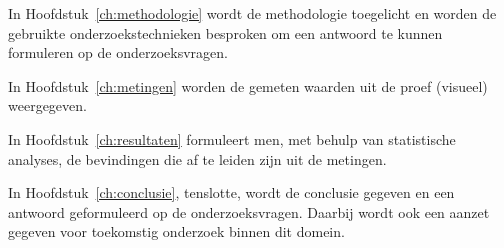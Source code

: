 In Hoofdstuk~\ref{ch:methodologie} wordt de methodologie toegelicht en worden de gebruikte onderzoekstechnieken besproken om een antwoord te kunnen formuleren op de onderzoeksvragen.


In Hoofdstuk~\ref{ch:metingen} worden de gemeten waarden uit de proef (visueel) weergegeven.

In Hoofdstuk~\ref{ch:resultaten} formuleert men, met behulp van statistische analyses, de bevindingen die af te leiden zijn uit de metingen.

In Hoofdstuk~\ref{ch:conclusie}, tenslotte, wordt de conclusie gegeven en een antwoord geformuleerd op de onderzoeksvragen. Daarbij wordt ook een aanzet gegeven voor toekomstig onderzoek binnen dit domein.